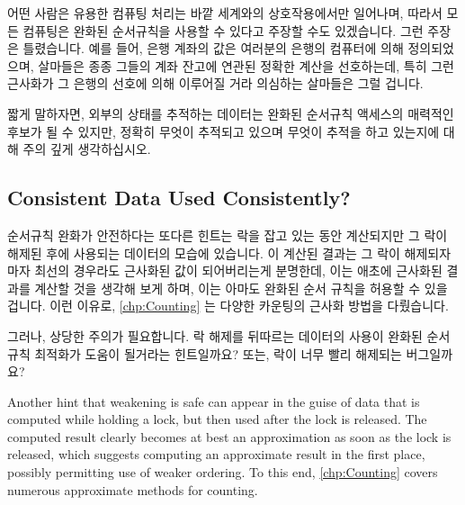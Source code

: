 어떤 사람은 유용한 컴퓨팅 처리는 바깥 세계와의 상호작용에서만 일어나며, 따라서
모든 컴퓨팅은 완화된 순서규칙을 사용할 수 있다고 주장할 수도 있겠습니다.
그런 주장은 틀렸습니다.
예를 들어, 은행 계좌의 값은 여러분의 은행의 컴퓨터에 의해 정의되었으며,
살마들은 종종 그들의 계좌 잔고에 연관된 정확한 계산을 선호하는데, 특히 그런
근사화가 그 은행의 선호에 의해 이루어질 거라 의심하는 살마들은 그럴 겁니다.

짧게 말하자면, 외부의 상태를 추적하는 데이터는 완화된 순서규칙 액세스의
매력적인 후보가 될 수 있지만, 정확히 무엇이 추적되고 있으며 무엇이 추적을 하고
있는지에 대해 주의 깊게 생각하십시오.

\iffalse

Some might argue that useful computing deals only with the outside world,
and therefore that all computing can use weak ordering.
Such arguments are incorrect.
For example, the value of your bank account is defined within your
bank's computers, and people often prefer exact computations involving
their account balances, especially those who might suspect that any such
approximations would be in the bank's favor.

In short, although data tracking external state can be an attractive
candidate for weakly ordered access, please think carefully about
exactly what is being tracked and what is doing the tracking.

\fi

\subsection{Consistent Data Used Consistently?}
\label{sec:app:questions:Consistent Data Used Consistently?}

순서규칙 완화가 안전하다는 또다른 힌트는 락을 잡고 있는 동안 계산되지만 그 락이
해제된 후에 사용되는 데이터의 모습에 있습니다.
이 계산된 결과는 그 락이 해제되자마자 최선의 경우라도 근사화된 값이
되어버리는게 분명한데, 이는 애초에 근사화된 결과를 계산할 것을 생각해 보게
하며, 이는 아마도 완화된 순서 규칙을 허용할 수 있을 겁니다.
이런 이유로, \cref{chp:Counting} 는 다양한 카운팅의 근사화 방법을 다뤘습니다.

그러나, 상당한 주의가 필요합니다.
락 해제를 뒤따르는 데이터의 사용이 완화된 순서규칙 최적화가 도움이 될거라는
힌트일까요?
또는, 락이 너무 빨리 해제되는 버그일까요?

\iffalse

Another hint that weakening is safe can appear in the guise of data
that is computed while holding a lock, but then used after the lock
is released.
The computed result clearly becomes at best an approximation as soon as
the lock is released, which suggests computing an approximate result
in the first place, possibly permitting use of weaker ordering.
To this end, \cref{chp:Counting} covers numerous approximate methods
for counting.

